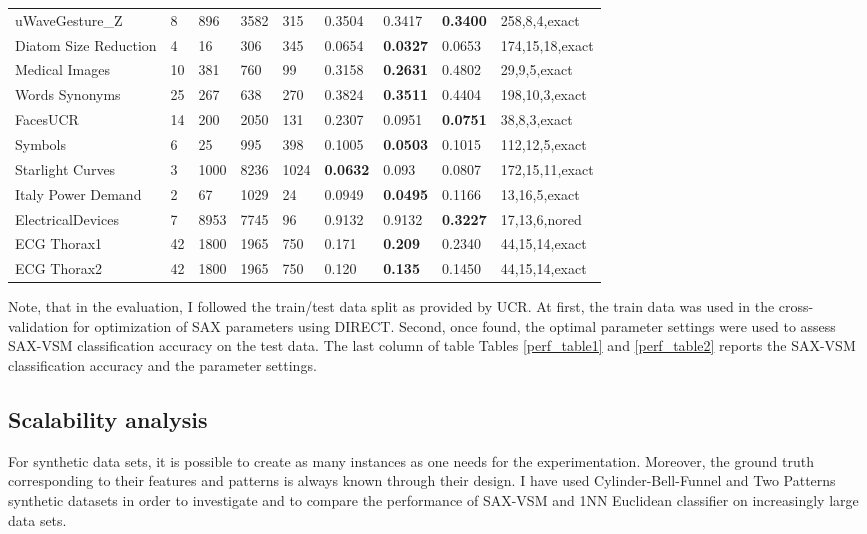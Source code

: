 \begin{table}[t!]
{{\begin{tabularx}{\linewidth}{@{} l *7X @{} l}
uWaveGesture\_Z & 8 & 896 & 3582 & 315 & 0.3504 & 0.3417 & \textbf{0.3400} & 258,8,4,exact \\
Diatom Size Reduction & 4 & 16 & 306 & 345 & 0.0654 & \textbf{0.0327} & 0.0653 & 174,15,18,exact \\
Medical Images & 10 & 381 & 760 & 99 & 0.3158 & \textbf{0.2631} & 0.4802 & 29,9,5,exact \\
Words Synonyms & 25 & 267 & 638 & 270 & 0.3824 & \textbf{0.3511} & 0.4404 & 198,10,3,exact \\
FacesUCR & 14 & 200 & 2050 & 131 & 0.2307 & 0.0951 & \textbf{0.0751} & 38,8,3,exact \\
Symbols & 6 & 25 & 995 & 398 & 0.1005 & \textbf{0.0503} & 0.1015 & 112,12,5,exact \\
Starlight Curves & 3 & 1000 & 8236 & 1024 & \textbf{0.0632} & 0.093 & 0.0807 & 172,15,11,exact \\
Italy Power Demand & 2 & 67 & 1029 & 24 & 0.0949 & \textbf{0.0495} & 0.1166 & 13,16,5,exact \\
ElectricalDevices & 7 & 8953 & 7745 & 96 & 0.9132 & 0.9132 & \textbf{0.3227} & 17,13,6,nored \\
ECG Thorax1 & 42 & 1800 & 1965 & 750 & 0.171 & \textbf{0.209} & 0.2340 & 44,15,14,exact \\
ECG Thorax2 & 42 & 1800 & 1965 & 750 & 0.120 & \textbf{0.135} & 0.1450 & 44,15,14,exact \\
\hline
\end{tabularx}
}}
\end{table}

\clearpage
Note, that in the evaluation, I followed the train/test data split as provided by UCR. 
At first, the train data was used in the cross-validation for optimization of SAX parameters 
using \mbox{DIRECT}. Second, once found, the optimal parameter settings were used to assess SAX-VSM 
classification accuracy on the test data. 
The last column of table Tables \ref{perf_table1} and \ref{perf_table2} reports the SAX-VSM 
classification accuracy and the parameter settings.

\subsection{Scalability analysis} \label{scalability}
For synthetic data sets, it is possible to create as many instances as one needs for the experimentation. 
Moreover, the ground truth corresponding to their features and patterns is always known through their design.
I have used Cylinder-Bell-Funnel \cite{cbf} and Two Patterns \cite{two_patterns} synthetic datasets 
in order to investigate and to compare the performance of SAX-VSM and 1NN Euclidean classifier on increasingly 
large data sets.

